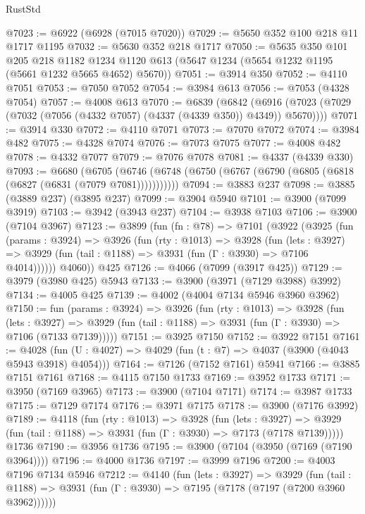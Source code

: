 \begin{lexlean}{RustStd}
\begin{coremodule}
@7023 := @6922 (@6928 (@7015 @7020))
@7029 := @5650 @352 @100 @218 @11 @1717 @1195
@7032 := @5630 @352 @218 @1717
@7050 := @5635
    @350
    @101
    @205
    @218
    @1182
    @1234
    @1120
    @613
    (@5647 @1234 (@5654 @1232 @1195 (@5661 @1232 @5665 @4652) @5670))
@7051 := @3914 @350
@7052 := @4110 @7051
@7053 := @7050 @7052
@7054 := @3984 @613
@7056 := @7053 (@4328 @7054)
@7057 := @4008 @613
@7070 := @6839
    (@6842 (@6916 (@7023 (@7029 (@7032 (@7056 (@4332 @7057) (@4337 (@4339 @350)) @4349)) @5670))))
@7071 := @3914 @330
@7072 := @4110 @7071
@7073 := @7070 @7072
@7074 := @3984 @482
@7075 := @4328 @7074
@7076 := @7073 @7075
@7077 := @4008 @482
@7078 := @4332 @7077
@7079 := @7076 @7078
@7081 := @4337 (@4339 @330)
@7093 := @6680
    (@6705 (@6746 (@6748 (@6750 (@6767 (@6790 (@6805 (@6818 (@6827 (@6831 (@7079 @7081)))))))))))
@7094 := @3883 @237
@7098 := @3885 (@3889 @237) (@3895 @237)
@7099 := @3904 @5940
@7101 := @3900 (@7099 @3919)
@7103 := @3942 (@3943 @237)
@7104 := @3938 @7103
@7106 := @3900 (@7104 @3967)
@7123 := @3899
    (fun (fn : @78) =>
    @7101
      (@3922
        (@3925
          (fun (params : @3924) =>
          @3926
            (fun (rty : @1013) =>
            @3928
              (fun (lets : @3927) =>
              @3929 (fun (tail : @1188) => @3931 (fun (Γ : @3930) => @7106 @4014))))))
        @4060))
    @425
@7126 := @4066 (@7099 (@3917 @425))
@7129 := @3979 (@3980 @425) @5943
@7133 := @3900 (@3971 (@7129 @3988) @3992)
@7134 := @4005 @425
@7139 := @4002 (@4004 @7134 @5946 @3960 @3962)
@7150 := fun (params : @3924) =>
  @3926
    (fun (rty : @1013) =>
    @3928
      (fun (lets : @3927) =>
      @3929 (fun (tail : @1188) => @3931 (fun (Γ : @3930) => @7106 (@7133 @7139)))))
@7151 := @3925 @7150
@7152 := @3922 @7151
@7161 := @4028 (fun (U : @4027) => @4029 (fun (t : @7) => @4037 (@3900 (@4043 @5943 @3918) @4054)))
@7164 := @7126 (@7152 @7161) @5941
@7166 := @3885 @7151 @7161
@7168 := @4115 @7150 @1733
@7169 := @3952 @1733
@7171 := @3950 (@7169 @3965)
@7173 := @3900 (@7104 @7171)
@7174 := @3987 @1733
@7175 := @7129 @7174
@7176 := @3971 @7175
@7178 := @3900 (@7176 @3992)
@7189 := @4118
    (fun (rty : @1013) =>
    @3928
      (fun (lets : @3927) =>
      @3929 (fun (tail : @1188) => @3931 (fun (Γ : @3930) => @7173 (@7178 @7139)))))
    @1736
@7190 := @3956 @1736
@7195 := @3900 (@7104 (@3950 (@7169 (@7190 @3964))))
@7196 := @4000 @1736
@7197 := @3999 @7196
@7200 := @4003 @7196 @7134 @5946
@7212 := @4140
    (fun (lets : @3927) =>
    @3929
      (fun (tail : @1188) => @3931 (fun (Γ : @3930) => @7195 (@7178 (@7197 (@7200 @3960 @3962))))))

\end{coremodule}
\end{lexlean}
